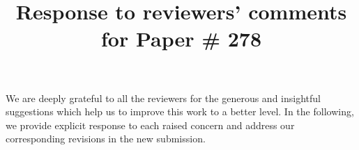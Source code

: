 \documentclass{vldb}
\begin{document}
\title{Response to reviewers' comments for Paper \# 278}
\maketitle

We are deeply grateful to all the reviewers for the generous and insightful
suggestions which help us to improve this work to a better level.
In the following, we provide explicit response to each raised concern and address our corresponding revisions in the new submission.





\end{document}
